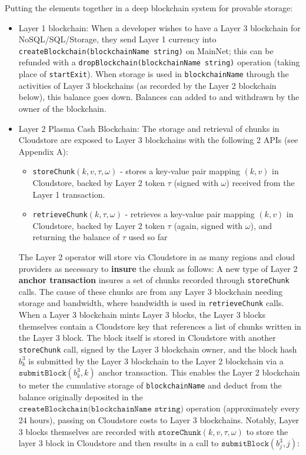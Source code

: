 \documentclass{article}
\newcommand{\blockhash}[2]{b^{#1}_{#2}}
\newcommand{\signature}{\omega}
\newcommand{\submitblock}[2]{\texttt{submitBlock}(#2, #1)}
\begin{document}
Putting the elements together in a deep blockchain system for provable storage: 
\begin{itemize}
\item Layer 1 blockchain: When a developer wishes to have a Layer 3 blockchain for NoSQL/SQL/Storage, they send Layer 1 currency into \texttt{createBlockchain(blockchainName string)} on MainNet; this can be refunded with a {\tt dropBlockchain(blockchainName string)} operation (taking place of {\tt startExit}).  When storage is used in {\tt blockchainName} through the activities of Layer 3 blockchains (as recorded by the Layer 2 blockchain below), this balance goes down.  Balances can added to and withdrawn by the owner of the blockchain.

\item Layer 2 Plasma Cash Blockchain: The storage and retrieval of chunks in Cloudstore are exposed to Layer 3 blockchains with the following 2 APIs (see Appendix A):
\begin{itemize}
    \item \texttt{storeChunk}$(k, v, \tau, \signature)$ - stores a key-value pair mapping $(k,v)$ in Cloudstore, backed by Layer 2 token $\tau$ (signed with $\signature$) received from the Layer 1 transaction.  
    \item \texttt{retrieveChunk}$(k, \tau, \signature)$ - retrieves a key-value pair mapping $(k,v)$ in Cloudstore, backed by Layer 2 token $\tau$ (again, signed with $\signature$), and returning the balance of $\tau$ used so far  
\end{itemize}
The Layer 2 operator will store via Cloudstore in as many regions and cloud providers as necessary to {\bf insure} the chunk as follows:  A new type of Layer 2 {\bf anchor transaction} insures a set of chunks recorded through \texttt{storeChunk} calls.  The cause of these chunks are from any Layer 3 blockchain needing storage and bandwidth, where bandwidth is used in \texttt{retrieveChunk} calls.  When a Layer 3 blockchain mints Layer 3 blocks, the Layer 3 blocks themselves contain a Cloudstore key that references a list of chunks written in the Layer 3 block.  The block itself is stored in Cloudstore with another \texttt{storeChunk} call, signed by the Layer 3 blockchain owner, and the block hash $\blockhash{3}{k}$ is submitted by the Layer 3 blockchain to the Layer 2 blockchain via a $\submitblock{k}{\blockhash{3}{k}}$ anchor transaction.  This enables the Layer 2 blockchain to meter the cumulative storage of {\tt blockchainName} and deduct from the balance originally deposited in the $\texttt{createBlockchain(blockchainName string)}$ operation (approximately every 24 hours), passing on Cloudstore costs to Layer 3 blockchains.  Notably, Layer 3 blocks themselves are recorded with $\texttt{storeChunk}(k, v, \tau, \signature)$ to store the layer 3 block in Cloudstore and then results in a call to $\submitblock{j}{\blockhash{3}{j}}$:

\end{itemize}
\end{document}
